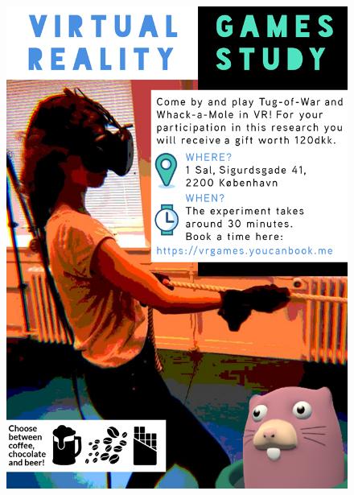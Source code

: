 \begin{figure}[H]
\centering
{}
  \includegraphics[width=\linewidth]{Images/poster.png}
\endminipage
\end{figure}
